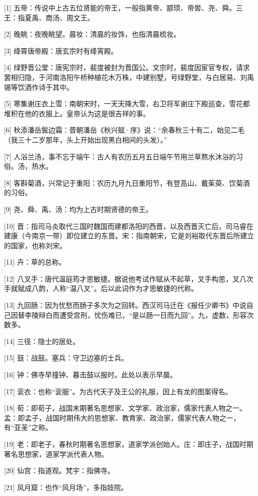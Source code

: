 \documentclass[12pt,UTF8]{ctexbook}
\begin{document}
[1] 五帝：传说中上古五位贤能的帝王，一般指黄帝、颛顼、帝喾、尧、舜。三王：指夏禹、商汤、周文王。

[2] 晚眺：夜晚眺望。晨妆：清晨的妆饰，也指清晨梳妆。

[3] 绛霄唐帝殿：唐玄宗时有绛宵殿。

[4] 绿野晋公堂：唐宪宗时，裴度被封为晋国公。文宗时，裴度因宦官专权，请求罢相归隐，于河南洛阳午桥种植花木万株，中建别墅，号绿野堂，与白居易、刘禹锡等饮酒作诗于其中。

[5] 寒集谢庄衣上雪：南朝宋时，一天天降大雪，右卫将军谢庄下殿巡查，雪花都堆积在他的衣服上。皇帝认为这是很吉祥的事。

[6] 秋添潘岳鬓边霜：晋朝潘岳《秋兴赋·序》说：“余春秋三十有二，始见二毛（我三十二岁那年，头上开始出现黑白相间的头发）。”

[7] 人浴兰汤，事不忘于端午：古人有农历五月五日端午节用兰草熬水沐浴的习俗。汤，热水。

[8] 客斟菊酒，兴常记于重阳：农历九月九日重阳节，有登高山、戴茱萸、饮菊酒的习俗。

[9] 尧、舜、禹、汤：均为上古时期贤德的帝王。

[10] 晋：指司马炎取代三国时魏国而建都洛阳的西晋，以及西晋灭亡后，司马睿在建康（今南京一带）即位建立的东晋。宋：指南朝宋，它是刘裕取代东晋后所建立的国家，也称刘宋。

[11] 卉：草的总称。

[12] 八叉手：唐代温庭筠才思敏捷。据说他考试作赋从不起草，叉手构思，叉八次手就赋成八韵，人称“温八叉”。后以此词作为才思敏捷的代称。

[13] 九回肠：因为忧愁而肠子多次为之回转。西汉司马迁在《报任少卿书》中说自己因替李陵辩白而遭受宫刑，忧伤难已，“是以肠一日而九回”。九，虚数，形容次数多。

[14] 三径：隐士的居处。

[15] 鼓：战鼓。塞兵：守卫边塞的士兵。

[16] 钟：佛寺早撞钟、暮击鼓以报时。此处以表示早晨。

[17] 衮衣：也称“衮服”。为古代天子及王公的礼服，因上有龙的图案得名。

[18] 荀：即荀子，战国末期著名思想家、文学家、政治家，儒家代表人物之一。孟：即孟子，战国时期伟大的思想家、教育家、政治家，儒家代表人物之一，有“亚圣”之称。

[19] 老：即老子，春秋时期著名思想家，道家学派创始人。庄：即庄子，战国时期著名思想家，道家学派代表人物。

[20] 仙宫：指道观。梵宇：指佛寺。

[21] 风月窟：也作“风月场”，多指妓院。
\end{document}
